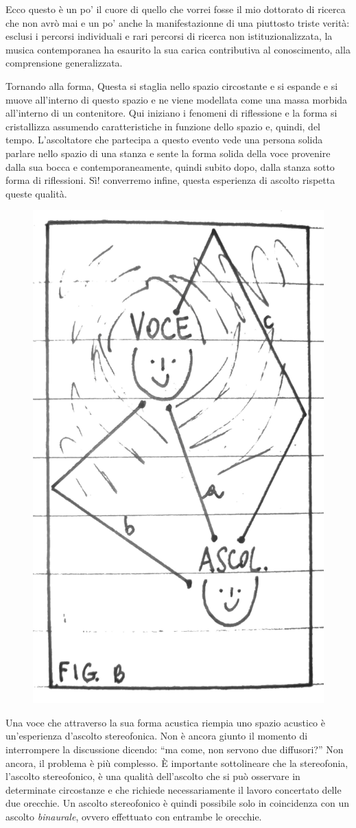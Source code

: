 Ecco questo è un po' il cuore di quello che vorrei fosse il mio dottorato di
ricerca che non avrò mai e un po' anche la manifestazionne di una piuttosto
triste verità: esclusi i percorsi individuali e rari percorsi di ricerca
non istituzionalizzata, la musica contemporanea ha esaurito la sua carica
contributiva al conoscimento, alla comprensione generalizzata.

Tornando alla forma, Questa si staglia nello spazio circostante e si espande e si muove
all'interno di questo spazio e ne viene modellata come una massa morbida all'interno
di un contenitore. Qui iniziano i fenomeni di riflessione e la forma si
cristallizza assumendo caratteristiche in funzione dello spazio e, quindi, del tempo.
L'ascoltatore che partecipa a questo evento vede una persona solida parlare nello
spazio di una stanza e sente la forma solida della voce provenire dalla sua bocca
e contemporaneamente, quindi subito dopo, dalla stanza sotto forma di riflessioni.
Sì! converremo infine, questa esperienza di ascolto rispetta queste qualità.

\begin{figure}[h]
\begin{center}
  \includegraphics[width=.48\linewidth]{CAPITOLI/1000/IMG/figb.png}
\label{ee:figb}
\end{center}
\end{figure}

Una voce che attraverso la sua forma acustica riempia uno spazio acustico è
un'esperienza d'ascolto stereofonica. Non è ancora giunto il momento di
interrompere la discussione dicendo: “ma come, non servono due diffusori?” Non
ancora, il problema è più complesso. È importante sottolineare che la stereofonia,
l'ascolto stereofonico, è una qualità dell'ascolto che si può osservare in
determinate circostanze e che richiede necessariamente il lavoro concertato delle
due orecchie. Un ascolto stereofonico è quindi possibile solo in coincidenza
con un ascolto \emph{binaurale}, ovvero effettuato con entrambe le orecchie.

